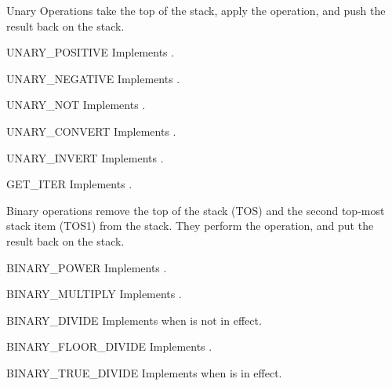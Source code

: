 Unary Operations take the top of the stack, apply the operation, and
push the result back on the stack.

\begin{opcodedesc}{UNARY_POSITIVE}{}
Implements .
\end{opcodedesc}

\begin{opcodedesc}{UNARY_NEGATIVE}{}
Implements .
\end{opcodedesc}

\begin{opcodedesc}{UNARY_NOT}{}
Implements .
\end{opcodedesc}

\begin{opcodedesc}{UNARY_CONVERT}{}
Implements .
\end{opcodedesc}

\begin{opcodedesc}{UNARY_INVERT}{}
Implements .
\end{opcodedesc}

\begin{opcodedesc}{GET_ITER}{}
Implements .
\end{opcodedesc}

Binary operations remove the top of the stack (TOS) and the second top-most
stack item (TOS1) from the stack.  They perform the operation, and put the
result back on the stack.

\begin{opcodedesc}{BINARY_POWER}{}
Implements .
\end{opcodedesc}

\begin{opcodedesc}{BINARY_MULTIPLY}{}
Implements .
\end{opcodedesc}

\begin{opcodedesc}{BINARY_DIVIDE}{}
Implements  when
 is not in effect.
\end{opcodedesc}

\begin{opcodedesc}{BINARY_FLOOR_DIVIDE}{}
Implements .
\end{opcodedesc}

\begin{opcodedesc}{BINARY_TRUE_DIVIDE}{}
Implements  when
 is in effect.
\end{opcodedesc}

